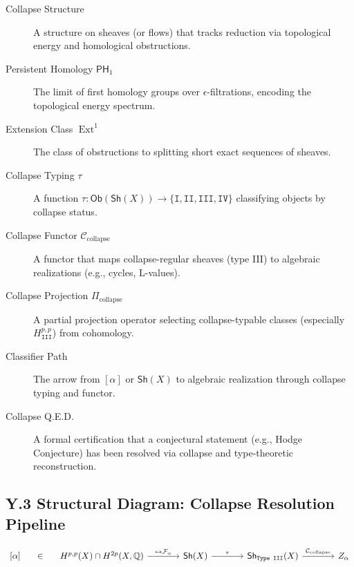 \documentclass[11pt]{article}
\DeclareMathOperator{\Ext}{Ext}
\begin{document}
\begin{description}
  \item[Collapse Structure]  
  A structure on sheaves (or flows) that tracks reduction via topological energy and homological obstructions.
  
  \item[Persistent Homology $\mathsf{PH}_1$]  
  The limit of first homology groups over $\epsilon$-filtrations, encoding the topological energy spectrum.

  \item[Extension Class $\Ext^1$]  
  The class of obstructions to splitting short exact sequences of sheaves.

  \item[Collapse Typing $\tau$]  
  A function $\tau: \mathsf{Ob}(\mathsf{Sh}(X)) \to \{\texttt{I}, \texttt{II}, \texttt{III}, \texttt{IV}\}$ classifying objects by collapse status.

  \item[Collapse Functor $\mathcal{C}_{\text{collapse}}$]  
  A functor that maps collapse-regular sheaves (type III) to algebraic realizations (e.g., cycles, L-values).

  \item[Collapse Projection $\Pi_{\text{collapse}}$]  
  A partial projection operator selecting collapse-typable classes (especially $H^{p,p}_{\texttt{III}}$) from cohomology.

  \item[Classifier Path]  
  The arrow from $[\alpha]$ or $\mathsf{Sh}(X)$ to algebraic realization through collapse typing and functor.

  \item[Collapse Q.E.D.]  
  A formal certification that a conjectural statement (e.g., Hodge Conjecture) has been resolved via collapse and type-theoretic reconstruction.
\end{description}

\subsection*{Y.3 Structural Diagram: Collapse Resolution Pipeline}

\[
\begin{tikzcd}[row sep=large, column sep=large]
[\alpha] \arrow[r, phantom, "\in"]
& H^{p,p}(X) \cap H^{2p}(X, \mathbb{Q}) \arrow[r, "\mapsto \mathcal{F}_\alpha"]
& \mathsf{Sh}(X) \arrow[r, "\tau"]
& \mathsf{Sh}_{\texttt{Type III}}(X) \arrow[r, "\mathcal{C}_{\text{collapse}}"]
& Z_\alpha
\end{tikzcd}
\]
\end{document}
